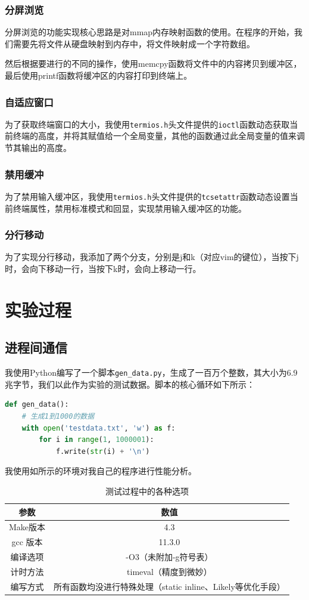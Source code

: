 \documentclass[lang=cn,a4paper,newtx]{elegantpaper}
\begin{document}
\subsubsection{分屏浏览}

分屏浏览的功能实现核心思路是对mmap内存映射函数的使用。在程序的开始，我们需要先将文件从硬盘映射到内存中，将文件映射成一个字符数组。

然后根据要进行的不同的操作，使用memcpy函数将文件中的内容拷贝到缓冲区，最后使用printf函数将缓冲区的内容打印到终端上。
\subsubsection{自适应窗口}
为了获取终端窗口的大小，我使用\verb|termios.h|头文件提供的\verb|ioctl|函数动态获取当前终端的高度，并将其赋值给一个全局变量，其他的函数通过此全局变量的值来调节其输出的高度。
\subsubsection{禁用缓冲}
为了禁用输入缓冲区，我使用\verb|termios.h|头文件提供的\verb|tcsetattr|函数动态设置当前终端属性，禁用标准模式和回显，实现禁用输入缓冲区的功能。
\subsubsection{分行移动}
为了实现分行移动，我添加了两个分支，分别是j和k（对应vim的键位），当按下j时，会向下移动一行，当按下k时，会向上移动一行。
\section{实验过程}
\subsection{进程间通信}

我使用Python编写了一个脚本\verb|gen_data.py|，生成了一百万个整数，其大小为6.9兆字节，我们以此作为实验的测试数据。脚本的核心循环如下所示：
\begin{lstlisting}[language=python]
    def gen_data():
    # 生成1到1000的数据
    with open('testdata.txt', 'w') as f:
        for i in range(1, 1000001):
            f.write(str(i) + '\n')
\end{lstlisting}

我使用如所示的环境对我自己的程序进行性能分析。
\begin{table}[htbp]
\centering
\caption{测试过程中的各种选项}
\label{table:com_env}
\begin{tabular}{cc}
\hline
\textbf{参数} & \textbf{数值}           \\ \hline
Make版本      & 4.3                   \\
gcc 版本      & 11.3.0                \\
编译选项        & -O3（未附加-g符号表）         \\
计时方法        & timeval（精度到微妙）        \\
编写方式        & 所有函数均没进行特殊处理（static inline、Likely等优化手段） \\ \hline
\end{tabular}

\end{table}
\end{document}
